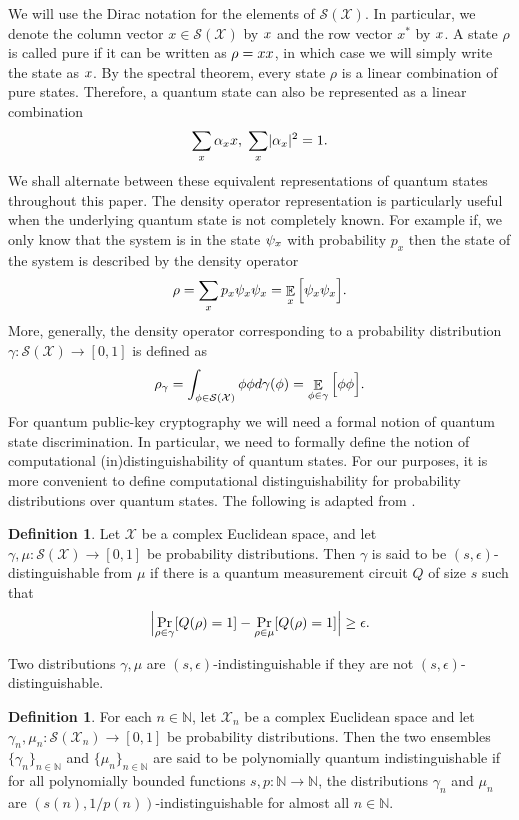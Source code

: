\documentclass[11pt]{article}
\theoremstyle{plain}
\theoremstyle{definition}
\newtheorem{definition}[theorem]{Definition}
\DeclareMathOperator{\E}{\mathbb{E}}
\DeclarePairedDelimiter{\abs}{\lvert}{\rvert}
\let\ket\relax
\DeclarePairedDelimiter{\ket}{\lvert}{\rangle}
\let\bra\relax
\DeclarePairedDelimiter{\bra}{\langle}{\rvert}
\def\N{\mathbb{N}}
\def\X{\mathcal{X}}
\def\SX{\mathcal{S(X)}}
\begin{document}
We will use the Dirac notation for the elements of $\SX$. In particular, we denote the column vector $x \in \SX$ by $\ket{x}$ and the row vector $x^*$ by $\bra{x}$. A state $\rho$ is called pure if it can be written as $\rho = \ket{x}\bra{x}$, in which case we will simply write the state as $\ket{x}$. By the spectral theorem, every state $\rho$ is a linear combination of pure states. Therefore, a quantum state can also be represented as a linear combination
\[ \sum_{x} \alpha_x \ket{x}, \hspace*{1mm} \sum_{x} \abs{\alpha_x}^2 = 1. \]
We shall alternate between these equivalent representations of quantum states throughout this paper. The density operator representation is particularly useful when the underlying quantum state is not completely known. For example if, we only know that the system is in the state $\ket{\psi_x}$ with probability $p_x$ then the state of the system is described by the density operator
\[ \rho = \sum_{x} p_x \ket{\psi_x}\bra{\psi_x} = \E_x \Big[ \ket{\psi_x} \bra{\psi_x} \Big]. \]
More, generally, the density operator corresponding to a probability distribution $\gamma: \SX \rightarrow [0, 1]$ is defined as
\[ \rho_\gamma = \int_{\ket{\phi} \in \SX} \ket{\phi}\bra{\phi} d\gamma(\ket{\phi}) = \E_{\ket{\phi} \in \gamma} \Big[ \ket{\phi}\bra{\phi} \Big]. \]
For quantum public-key cryptography we will need a formal notion of quantum state discrimination. In particular, we need to formally define the notion of computational (in)distinguishability of quantum states. For our purposes, it is more convenient to define computational distinguishability for probability distributions over quantum states. The following is adapted from \cite[\S 3.3]{watrous2009zero}.
\begin{definition}
    Let $\X$ be a complex Euclidean space, and let $\gamma, \mu: \SX \rightarrow [0, 1]$ be probability distributions. Then $\gamma$ is said to be $(s, \epsilon)$-distinguishable from $\mu$ if there is a quantum measurement circuit $Q$ of size $s$ such that
    \[ \abs[\Big]{ \Pr_{\rho \in \gamma}[Q(\rho) = 1] - \Pr_{\rho \in \mu}[Q(\rho) = 1]} \ge \epsilon. \]
\end{definition} 
Two distributions $\gamma, \mu$ are $(s, \epsilon)$-indistinguishable if they are not $(s, \epsilon)$-distinguishable.
\begin{definition}
    For each $n \in \N$, let $\X_n$ be a complex Euclidean space and let $\gamma_n, \mu_n: \mathcal{S}(\X_n) \rightarrow [0, 1]$ be probability distributions. Then the two ensembles $\{ \gamma_n \}_{n \in \N}$ and $\{ \mu_n \}_{n \in \N}$ are said to be polynomially quantum indistinguishable if for all polynomially bounded functions $s, p: \N \rightarrow \N$, the distributions $\gamma_n$ and $\mu_n$ are $(s(n), 1 / p(n))$-indistinguishable for almost all $n \in \N$.
\end{definition}
\end{document}
